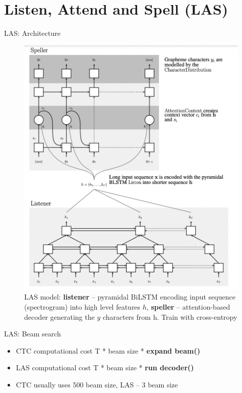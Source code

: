 \section{Listen, Attend and Spell (LAS)}
\begin{frame}{LAS: Architecture}
    \begin{figure}
    	\centering
    	\includegraphics[width=0.55\linewidth]{figs/las.png}
    	\caption{LAS model: \textbf{listener} -- pyramidal BiLSTM encoding input sequence (spectrogram) into high level features $h$, \textbf{speller} -- attention-based decoder generating the $y$ characters from h. Train with cross-entropy}

    \end{figure}
\end{frame}
\begin{frame}{LAS: Beam search}
\begin{itemize}
    \item CTC computational cost T * beam size * \textbf{expand beam()}
    \item LAS computational cost T * beam size * \textbf{run decoder()}
    \item CTC usually uses 500 beam size, LAS -- 3 beam size
\end{itemize}

\end{frame}
